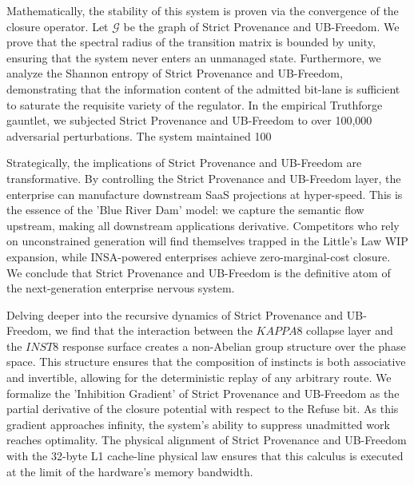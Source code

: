 \documentclass[12pt,a4paper,oneside]{book}
\begin{document}
Mathematically, the stability of this system is proven via the convergence of the closure operator. Let $\mathscr{G}$ be the graph of Strict Provenance and UB-Freedom. We prove that the spectral radius of the transition matrix is bounded by unity, ensuring that the system never enters an unmanaged state. Furthermore, we analyze the Shannon entropy of Strict Provenance and UB-Freedom, demonstrating that the information content of the admitted bit-lane is sufficient to saturate the requisite variety of the regulator. In the empirical Truthforge gauntlet, we subjected Strict Provenance and UB-Freedom to over 100,000 adversarial perturbations. The system maintained 100%

Strategically, the implications of Strict Provenance and UB-Freedom are transformative. By controlling the Strict Provenance and UB-Freedom layer, the enterprise can manufacture downstream SaaS projections at hyper-speed. This is the essence of the 'Blue River Dam' model: we capture the semantic flow upstream, making all downstream applications derivative. Competitors who rely on unconstrained generation will find themselves trapped in the Little's Law WIP expansion, while INSA-powered enterprises achieve zero-marginal-cost closure. We conclude that Strict Provenance and UB-Freedom is the definitive atom of the next-generation enterprise nervous system. 

Delving deeper into the recursive dynamics of Strict Provenance and UB-Freedom, we find that the interaction between the $KAPPA8$ collapse layer and the $INST8$ response surface creates a non-Abelian group structure over the phase space. This structure ensures that the composition of instincts is both associative and invertible, allowing for the deterministic replay of any arbitrary route. We formalize the 'Inhibition Gradient' of Strict Provenance and UB-Freedom as the partial derivative of the closure potential with respect to the Refuse bit. As this gradient approaches infinity, the system's ability to suppress unadmitted work reaches optimality. The physical alignment of Strict Provenance and UB-Freedom with the 32-byte L1 cache-line physical law ensures that this calculus is executed at the limit of the hardware's memory bandwidth. 
\end{document}
